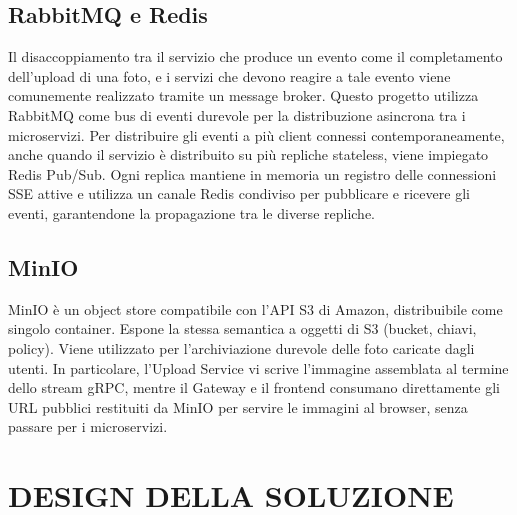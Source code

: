 \documentclass[conference]{IEEEtran}
\begin{document}
\subsection{RabbitMQ e Redis}
Il disaccoppiamento tra il servizio che produce un evento come il completamento dell'upload di una foto, e i servizi che devono reagire a tale evento viene comunemente realizzato tramite un message broker. Questo progetto utilizza RabbitMQ come bus di eventi durevole per la distribuzione asincrona tra i microservizi. Per distribuire gli eventi a più client connessi contemporaneamente, anche quando il servizio è distribuito su più repliche stateless, viene impiegato Redis Pub/Sub. Ogni replica mantiene in memoria un registro delle connessioni SSE attive e utilizza un canale Redis condiviso per pubblicare e ricevere gli eventi, garantendone la propagazione tra le diverse repliche\cite{b7,b8}.
\subsection{MinIO}
MinIO è un object store compatibile con l'API S3 di Amazon, distribuibile come singolo container. Espone la stessa semantica a oggetti di S3 (bucket, chiavi, policy). Viene utilizzato per l'archiviazione durevole delle foto caricate dagli utenti. In particolare, l'Upload Service vi scrive l'immagine assemblata al termine dello stream gRPC, mentre il Gateway e il frontend consumano direttamente gli URL pubblici restituiti da MinIO per servire le immagini al browser, senza passare per i microservizi\cite{b9}.
\section{DESIGN DELLA SOLUZIONE}
\end{document}
